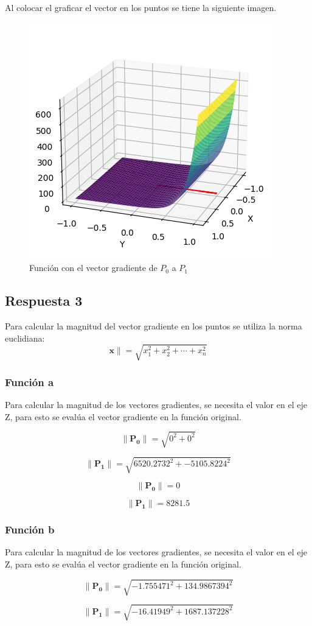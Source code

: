 \documentclass[12 pt]{article}
\begin{document}
Al colocar el graficar el vector en los puntos se tiene la siguiente imagen.
\begin{figure}[H]
    \centering
    \includegraphics[width=0.5\linewidth]{img/c_v.png}
    \caption{Función con el vector gradiente de $P_0$ a $P_1$}
    \label{fig:enter-label}
\end{figure}
\subsection{Respuesta 3}
Para calcular la magnitud del vector gradiente en los puntos se utiliza la norma euclidiana:
\[
\mathbf{x}\| = \sqrt{x_1^2 + x_2^2 + \cdots + x_n^2}
\]
\subsubsection{Función a}
Para calcular la magnitud de los vectores gradientes, se necesita el valor en el eje Z, para esto se evalúa el vector gradiente en la función original.


\[
\|\mathbf{P_0}\| = \sqrt{0^2 +  0^2}
\]

\[
\|\mathbf{P_1}\| = \sqrt{6520.2732^2 +  -5105.8224^2}
\]

\[
\|\mathbf{P_0}\| = 0
\]

\[
\|\mathbf{P_1}\| = 8281.5
\]

\subsubsection{Función b}
Para calcular la magnitud de los vectores gradientes, se necesita el valor en el eje Z, para esto se evalúa el vector gradiente en la función original.


\[
\|\mathbf{P_0}\| = \sqrt{-1.755471^2 +  134.9867394^2}
\]

\[
\|\mathbf{P_1}\| = \sqrt{-16.41949^2 +  1687.137228^2}
\]
\end{document}
